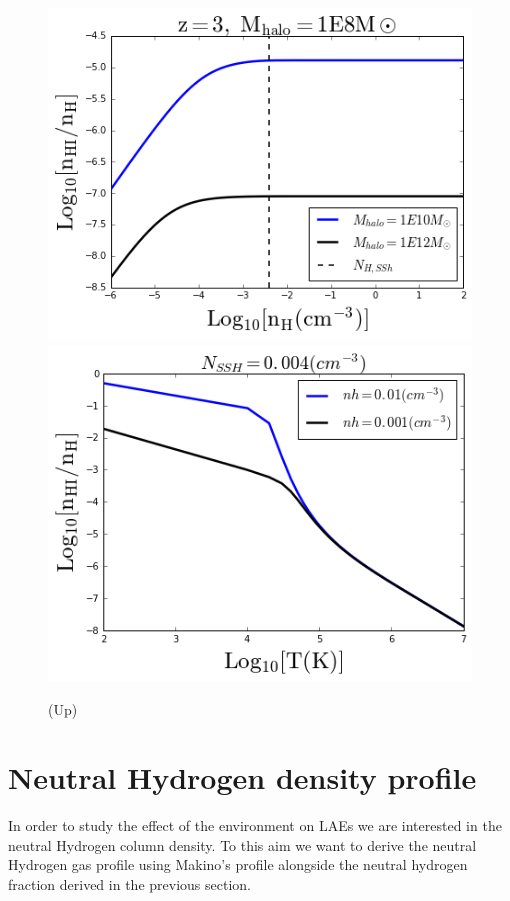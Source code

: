 \documentclass[12pt]{article}
\begin{document}
\begin{figure}[H]
\centering
\includegraphics[scale=0.5]{../code/etavsnh.png}
\includegraphics[scale=0.5]{../code/etavsT.png}
\caption{(Up)\label{fig:eta}}
\end{figure}

\section{Neutral Hydrogen density profile}\label{sec:NHI}

In order to study the effect of the environment on LAEs we are
interested in the neutral Hydrogen column density.
To this aim we want to derive the neutral Hydrogen gas profile using Makino's profile
alongside the neutral hydrogen fraction derived in the previous section.
\end{document}

